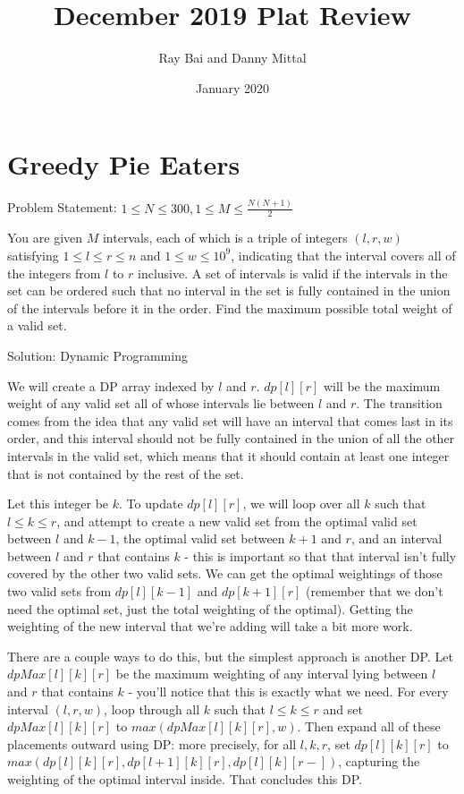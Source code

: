 \documentclass{article}
\title{December 2019 Plat Review}
\author{Ray Bai and Danny Mittal}
\date{January 2020}
\begin{document}
\maketitle

\section{Greedy Pie Eaters}

Problem Statement: $1 \leq N \leq 300, 1 \leq M \leq \frac {N(N + 1)} 2$

You are given $M$ intervals, each of which is a triple of integers $(l,r,w)$ satisfying $1 \leq l \leq r \leq n$ and $1 \leq w \leq 10^9$, indicating that the interval covers all of the integers from $l$ to $r$ inclusive. A set of intervals is valid if the intervals in the set can be ordered such that no interval in the set is fully contained in the union of the intervals before it in the order. Find the maximum possible total weight of a valid set.

Solution: Dynamic Programming

We will create a DP array indexed by $l$ and $r$. $dp[l][r]$ will be the maximum weight of any valid set all of whose intervals lie between $l$ and $r$. The transition comes from the idea that any valid set will have an interval that comes last in its order, and this interval should not be fully contained in the union of all the other intervals in the valid set, which means that it should contain at least one integer that is not contained by the rest of the set. 

Let this integer be $k$. To update $dp[l][r]$, we will loop over all $k$ such that $l \leq k \leq r$, and attempt to create a new valid set from the optimal valid set between $l$ and $k - 1$, the optimal valid set between $k + 1$ and $r$, and an interval between $l$ and $r$ that contains $k$ - this is important so that that interval isn’t fully covered by the other two valid sets. We can get the optimal weightings of those two valid sets from $dp[l][k - 1]$ and $dp[k + 1][r]$ (remember that we don’t need the optimal set, just the total weighting of the optimal). Getting the weighting of the new interval that we’re adding will take a bit more work.

There are a couple ways to do this, but the simplest approach is another DP. Let $dpMax[l][k][r]$ be the maximum weighting of any interval lying between $l$ and $r$ that contains $k$ - you’ll notice that this is exactly what we need. For every interval $(l, r, w)$, loop through all $k$ such that $l \leq k \leq r$ and set $dpMax[l][k][r]$ to $max(dpMax[l][k][r], w)$. Then expand all of these placements outward using DP: more precisely, for all $l, k, r$, set $dp[l][k][r]$ to $max(dp[l][k][r], dp[l + 1][k][r], dp[l][k][r -  ])$, capturing the weighting of the optimal interval inside. That concludes this DP.
\end{document}
